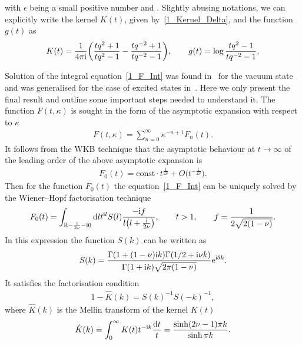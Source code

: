 \documentclass[pdftex]{sigma}
\numberwithin{equation}{section}
\begin{document}
with $\epsilon$ being a small positive number and . Slightly abusing notations, we can explicitly write the kernel $K(t)$, given by~\eqref{1_Kernel_Delta}, and the function $g(t)$ as
\begin{align*}
K(t)=\frac{1}{4\pi {\rm i}}\biggl(\frac{tq^2+1}{tq^2-1}-\frac{tq^{-2}+1}{tq^{-2}-1}\biggr), \qquad
g(t)=\log\frac{tq^2-1}{tq^{-2}-1}.
\end{align*}

Solution of the integral equation~\eqref{1_F_Int} was found in~\cite{HGS_4} for the vacuum state and was generalised for the case of excited states in~\cite{Boos_TBAE}. Here we only present the final result and outline some important steps needed to understand it. The function $F(t, \kappa)$ is sought in the form of the asymptotic expansion with respect to $\kappa$
\begin{align}\label{1_F_Asympotic}
F(t, \kappa)=\sum_{n=0}^{\infty} \kappa^{-n+1} F_n(t).
\end{align}
It follows from the WKB technique that the asymptotic behaviour at $t\rightarrow\infty$ of the leading order of the above asymptotic expansion is
\begin{align*}
F_0(t)=\text{const} \cdot t^{\frac{1}{2\nu}} + O\bigl(t^{-\frac{1}{2\nu}}\bigr).
\end{align*}
Then for the function $F_0(t)$ the equation~\eqref{1_F_Int} can be uniquely solved by the Wiener--Hopf factorisation technique
\begin{align*}
F_0(t)=\int_{\mathbb{R}-\frac{{\rm i}}{2\nu}-{\rm i}0} {\rm d}l t^{{\rm i}l} S(l) \frac{-{\rm i}f}{l\bigl(l+\frac{{\rm i}}{2\nu}\bigr)}, \qquad t>1, \qquad
f=\frac{1}{2\sqrt{2(1-\nu)}}.
\end{align*}
In this expression the function $S(k)$ can be written as
\begin{align*}
S(k)=\frac{\Gamma(1+(1-\nu){\rm i}k)\Gamma(1/2+{\rm i}\nu k)}{\Gamma(1+{\rm i}k)\sqrt{2\pi(1-\nu)}}{\rm e}^{{\rm i}\delta k}.
\end{align*}
It satisfies the factorisation condition
\begin{align*}
1-\hat{K}(k)=S(k)^{-1} S(-k)^{-1},
\end{align*}
where $\hat{K}(k)$ is the Mellin transform of the kernel $K(t)$
\begin{align*}
\hat{K}(k)=\int_0^\infty K(t) t^{-{\rm i}k}\frac{{\rm d}t}{t}=
\frac{\sinh(2\nu-1)\pi k}{\sinh\pi k}.
\end{align*}
\end{document}
